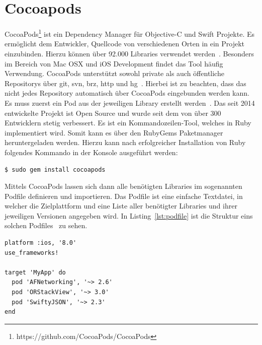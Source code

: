     \newpage
    \section{Cocoapods}\label{sec:cocoapods}
    CocoaPods\footnote{https://github.com/CocoaPods/CocoaPods} ist ein Dependency Manager für Objective-C und Swift Projekte.
    Es ermöglicht dem Entwickler, Quellcode von verschiedenen Orten in ein Projekt einzubinden.
    Hierzu können über 92.000 Libraries verwendet werden~\cite{cocoapods2}.
    Besonders im Bereich von Mac OSX und iOS Development findet das Tool häufig Verwendung.
    CocoaPods unterstützt sowohl private als auch öffentliche Repositorys über git, svn, brz, http und hg~\cite{cocoapods1}.
    Hierbei ist zu beachten, dass das nicht jedes Repository automatisch über CocoaPods eingebunden werden kann.
    Es muss zuerst ein Pod aus der jeweiligen Library erstellt werden~\cite{cocoapods3}.
    Das seit 2014 entwickelte Projekt ist Open Source und wurde seit dem von über 300 Entwicklern stetig verbessert.
    Es ist ein Kommandozeilen-Tool, welches in Ruby implementiert wird.
    Somit kann es über den RubyGems Paketmanager heruntergeladen werden.
    Hierzu kann nach erfolgreicher Installation von Ruby folgendes Kommando in der Konsole ausgeführt werden:
    \begin{lstlisting}[language=bash,label={lst:cocoapods}]
        $ sudo gem install cocoapods
    \end{lstlisting}
    Mittels CocoaPods lassen sich dann alle benötigten Libraries im sogenannten Podfile definieren und importieren.
    Das Podfile ist eine einfache Textdatei, in welcher die Zielplattform und eine Liste aller benötigter Libraries und ihrer jeweiligen Versionen angegeben wird.
    In Listing~\ref{lst:podfile} ist die Struktur eins solchen Podfiles~\cite{cocoapods2} zu sehen.
    \begin{lstlisting}[language={},firstnumber=1,label={lst:podfile},caption={Beispielstuktur eines Podfiles},captionpos=t]
platform :ios, '8.0'
use_frameworks!

target 'MyApp' do
  pod 'AFNetworking', '~> 2.6'
  pod 'ORStackView', '~> 3.0'
  pod 'SwiftyJSON', '~> 2.3'
end
    \end{lstlisting}


